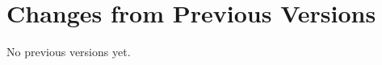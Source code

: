 \documentclass[11pt,a4paper]{ivoa}
\begin{document}
\section{Changes from Previous Versions}

No previous versions yet.



\end{document}
